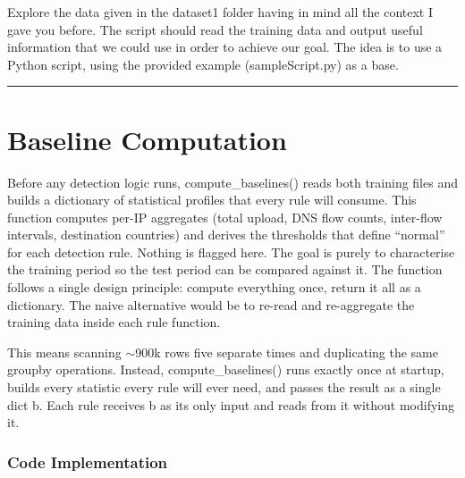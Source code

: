 \documentclass[
  11pt,
]{article}
\begin{document}
\begin{aiprompt}
Explore the data given in the dataset1 folder having in mind all the context I gave you before. The script should read the training data and output useful information that we could use in order to achieve our goal. The idea is to use a Python script, using the provided example (sampleScript.py) as a base.
\end{aiprompt}

\begin{center}\rule{0.5\linewidth}{0.5pt}\end{center}

\hypertarget{baseline-computation}{%
\section{Baseline Computation}\label{baseline-computation}}

Before any detection logic runs, compute\_baselines() reads both
training files and builds a dictionary of statistical profiles that
every rule will consume. This function computes per-IP aggregates (total
upload, DNS flow counts, inter-flow intervals, destination countries)
and derives the thresholds that define ``normal'' for each detection
rule. Nothing is flagged here. The goal is purely to characterise the
training period so the test period can be compared against it. The
function follows a single design principle: compute everything once,
return it all as a dictionary. The naive alternative would be to re-read
and re-aggregate the training data inside each rule function.

This means scanning $\sim$900k rows five separate times and
duplicating the same groupby operations. Instead, compute\_baselines()
runs exactly once at startup, builds every statistic every rule will
ever need, and passes the result as a single dict b. Each rule receives
b as its only input and reads from it without modifying it.


\hypertarget{code-implementation}{%
\subsubsection{Code Implementation}\label{code-implementation}}
\end{document}
